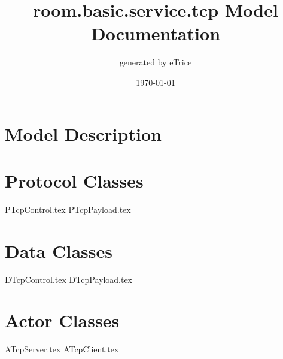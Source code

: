 \documentclass[titlepage]{article}
\title{room.basic.service.tcp Model Documentation}
\date{\today}
\author{generated by eTrice}
\begin{document}
\pagestyle{plain}
\maketitle
\tableofcontents

\newpage
\listoffigures
\newpage
\section{Model Description}




\section{Protocol Classes}
{PTcpControl.tex}
{PTcpPayload.tex}
\newpage


\section{Data Classes}
{DTcpControl.tex}
{DTcpPayload.tex}
\newpage

\section{Actor Classes}
{ATcpServer.tex}
{ATcpClient.tex}
\end{document}
